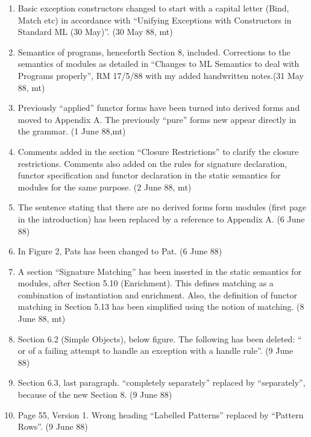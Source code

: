 \begin{description}
\begin{enumerate}
\item
Basic exception constructors changed to start with a capital
letter (Bind, Match etc) in accordance with ``Unifying 
Exceptions with Constructors in Standard ML (30 May)''.
(30 May 88, mt)

\item
Semantics of programs, henceforth Section 8, included.
Corrections to the semantics of modules as detailed in
``Changes to ML Semantics to deal with Programs properly'',
RM 17/5/88 with my added handwritten notes.(31 May 88, mt)

\item
Previously ``applied'' functor forms have been turned into
derived forms and moved to Appendix A. 
The previously ``pure'' forms new appear directly in the grammar. (1 June 88,mt)

\item
Comments added in the section ``Closure Restrictions'' to clarify
the closure restrictions.  Comments also added on the rules for
signature declaration, functor specification and functor declaration
in the static semantics for modules for the same purpose.
(2 June 88, mt)

\item
The sentence stating that there are no derived forms form modules (first page
in the introduction) has been replaced by a reference to Appendix A. 
(6 June 88)

\item
In Figure 2, Pats has been changed to Pat. (6 June  88)

\item
A section ``Signature Matching'' has been inserted in the static
semantics for modules, after Section 5.10 (Enrichment). This defines
matching as a combination of instantiation and enrichment.
Also, the definition of functor matching in Section 5.13 has been
simplified using the notion of matching. (8 June 88, mt)

\item
Section 6.2 (Simple Objects), below figure. The following has been deleted:
`` or of a failing attempt to handle an exception with a handle rule''.
(9 June 88)

\item
Section 6.3, last paragraph. ``completely separately'' replaced by ``separately'', because of the new Section 8. (9 June 88)

\item
Page 55, Version 1. Wrong heading ``Labelled Patterns'' replaced by
``Pattern Rows''. (9 June 88)


\end{enumerate}
\end{description}
